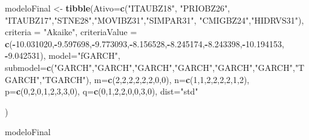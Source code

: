 \documentclass[
]{article}
\newenvironment{Shaded}{\begin{snugshade}}{\end{snugshade}}
\newcommand{\AttributeTok}[1]{\textcolor[rgb]{0.13,0.29,0.53}{#1}}
\newcommand{\DecValTok}[1]{\textcolor[rgb]{0.00,0.00,0.81}{#1}}
\newcommand{\FloatTok}[1]{\textcolor[rgb]{0.00,0.00,0.81}{#1}}
\newcommand{\FunctionTok}[1]{\textcolor[rgb]{0.13,0.29,0.53}{\textbf{#1}}}
\newcommand{\NormalTok}[1]{#1}
\newcommand{\OtherTok}[1]{\textcolor[rgb]{0.56,0.35,0.01}{#1}}
\newcommand{\SpecialCharTok}[1]{\textcolor[rgb]{0.81,0.36,0.00}{\textbf{#1}}}
\newcommand{\StringTok}[1]{\textcolor[rgb]{0.31,0.60,0.02}{#1}}
\begin{document}
\begin{Shaded}
\begin{Highlighting}[]
\NormalTok{modeloFinal }\OtherTok{\textless{}{-}} \FunctionTok{tibble}\NormalTok{(}\AttributeTok{Ativo=}\FunctionTok{c}\NormalTok{(}\StringTok{"ITAUBZ18"}\NormalTok{, }\StringTok{"PRIOBZ26"}\NormalTok{, }\StringTok{"ITAUBZ17"}\NormalTok{,}\StringTok{"STNE28"}\NormalTok{,}\StringTok{"MOVIBZ31"}\NormalTok{,}\StringTok{"SIMPAR31"}\NormalTok{, }\StringTok{"CMIGBZ24"}\NormalTok{,}\StringTok{"HIDRVS31"}\NormalTok{),}
             \AttributeTok{criteria =} \StringTok{"Akaike"}\NormalTok{,}
             \AttributeTok{criteriaValue =}
               \FunctionTok{c}\NormalTok{(}\SpecialCharTok{{-}}\FloatTok{10.031020}\NormalTok{,}\SpecialCharTok{{-}}\FloatTok{9.597698}\NormalTok{,}\SpecialCharTok{{-}}\FloatTok{9.773093}\NormalTok{,}\SpecialCharTok{{-}}\FloatTok{8.156528}\NormalTok{,}\SpecialCharTok{{-}}\FloatTok{8.245174}\NormalTok{,}\SpecialCharTok{{-}}\FloatTok{8.243398}\NormalTok{,}\SpecialCharTok{{-}}\FloatTok{10.194153}\NormalTok{, }\SpecialCharTok{{-}}\FloatTok{9.042531}\NormalTok{),}
             \AttributeTok{model=}\StringTok{"fGARCH"}\NormalTok{,}
             \AttributeTok{submodel=}\FunctionTok{c}\NormalTok{(}\StringTok{"GARCH"}\NormalTok{,}\StringTok{"GARCH"}\NormalTok{,}\StringTok{"GARCH"}\NormalTok{,}\StringTok{"GARCH"}\NormalTok{,}\StringTok{"GARCH"}\NormalTok{,}\StringTok{"GARCH"}\NormalTok{,}\StringTok{"TGARCH"}\NormalTok{,}\StringTok{"TGARCH"}\NormalTok{),}
             \AttributeTok{m=}\FunctionTok{c}\NormalTok{(}\DecValTok{2}\NormalTok{,}\DecValTok{2}\NormalTok{,}\DecValTok{2}\NormalTok{,}\DecValTok{2}\NormalTok{,}\DecValTok{2}\NormalTok{,}\DecValTok{2}\NormalTok{,}\DecValTok{0}\NormalTok{,}\DecValTok{0}\NormalTok{),}
             \AttributeTok{n=}\FunctionTok{c}\NormalTok{(}\DecValTok{1}\NormalTok{,}\DecValTok{1}\NormalTok{,}\DecValTok{2}\NormalTok{,}\DecValTok{2}\NormalTok{,}\DecValTok{2}\NormalTok{,}\DecValTok{2}\NormalTok{,}\DecValTok{1}\NormalTok{,}\DecValTok{2}\NormalTok{),}
             \AttributeTok{p=}\FunctionTok{c}\NormalTok{(}\DecValTok{0}\NormalTok{,}\DecValTok{2}\NormalTok{,}\DecValTok{0}\NormalTok{,}\DecValTok{1}\NormalTok{,}\DecValTok{2}\NormalTok{,}\DecValTok{3}\NormalTok{,}\DecValTok{3}\NormalTok{,}\DecValTok{0}\NormalTok{),}
             \AttributeTok{q=}\FunctionTok{c}\NormalTok{(}\DecValTok{0}\NormalTok{,}\DecValTok{1}\NormalTok{,}\DecValTok{2}\NormalTok{,}\DecValTok{2}\NormalTok{,}\DecValTok{0}\NormalTok{,}\DecValTok{0}\NormalTok{,}\DecValTok{3}\NormalTok{,}\DecValTok{0}\NormalTok{),}
             \AttributeTok{dist=}\StringTok{"std"}
             
\NormalTok{             )}

\NormalTok{modeloFinal}
\end{Highlighting}
\end{Shaded}
\end{document}
